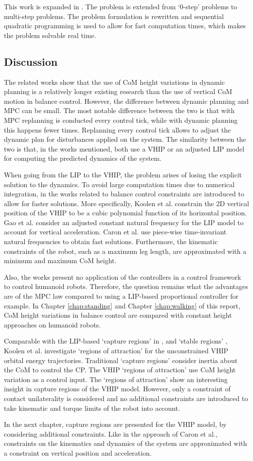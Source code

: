 This work is expanded in \cite{caron2018capturability}. The problem is extended from `0-step' problems to multi-step problems. The problem formulation is rewritten and sequential quadratic programming is used to allow for fast computation times, which makes the problem solvable real time.

\subsection{Discussion}
The related works show that the use of \ac{CoM} height variations in dynamic planning is a relatively longer existing research than the use of  vertical \ac{CoM} motion in balance control. However, the difference between dynamic planning and \ac{MPC} can be small. The most notable difference between the two is that with \ac{MPC} replanning is conducted every control tick, while with dynamic planning this happens fewer times. Replanning every control tick allows to adjust the dynamic plan for disturbances applied on the system. The similarity between the two is that, in the works mentioned, both use a \ac{VHIP} or an adjusted \ac{LIP} model for computing the predicted dynamics of the system.

When going from the \ac{LIP} to the \ac{VHIP}, the problem arises of losing the explicit solution to the dynamics. To avoid large computation times due to numerical integration, in the works related to balance control constraints are introduced to allow for faster solutions. More specifically, Koolen et al. constrain the \ac{2D} vertical position of the \ac{VHIP} to be a cubic polynomial function of its horizontal position. Gao et al. consider an adjusted constant natural frequency for the \ac{LIP} model to account for vertical acceleration. Caron et al. use piece-wise time-invariant natural frequencies to obtain fast solutions. Furthermore, the kinematic constraints of the robot, such as a maximum leg length, are approximated with a minimum and maximum \ac{CoM} height.

Also, the works present no application of the controllers in a control framework to control humanoid robots. Therefore, the question remains what the advantages are of the \ac{MPC} law compared to using a \ac{LIP}-based proportional controller for example. In Chapter \ref{chap:standing} and Chapter \ref{chap:walking} of this report, \ac{CoM} height variations in balance control are compared with constant height approaches on humanoid robots.

Comparable with the \ac{LIP}-based `capture regions' in \cite{pratt2006capture}, \cite{koolen2012capturability} and `stable regions' \cite{stephens2007humanoid},  Koolen et al. investigate `regions of attraction' for the unconstrained \ac{VHIP} orbital energy trajectories. Traditional `capture regions' consider inertia about the \ac{CoM} to control the \ac{CP}. The \ac{VHIP} `regions of attraction' use \ac{CoM} height variation as a control input. The `regions of attraction' show an interesting insight in capture regions of the \ac{VHIP} model. However, only a constraint of contact unilaterality is considered and no additional constraints are introduced to take kinematic and torque limits of the robot into account. 

In the next chapter, capture regions are presented for the \ac{VHIP} model, by considering additional constraints. Like in the approach of Caron et al., constraints on the kinematics and dynamics of the system are approximated with a constraint on vertical position and acceleration.